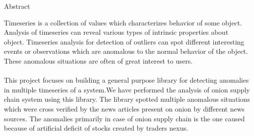 \begin{center}
\LARGE{Abstract}
\end{center}

\vspace{0.5in}


Timeseries is a collection of values which characterizes behavior of some object. Analysis of timeseries can reveal various types of intrinsic properties about object. Timeseries analysis for detection of outliers can spot different interesting events or observations which are anomalous to the normal behavior of the object. These anomalous situations are often of great interest to users.\\
\\
This project focuses on building a general purpose library for detecting anomalies in multiple timeseries of a system.We have performed the analysis of onion supply chain system using this library. The library spotted multiple anomalous situations which were cross verified by the news articles present on onion by different news sources. The anomalies primarily in case of onion supply chain is the one caused because of artificial deficit of stocks created by traders nexus.
